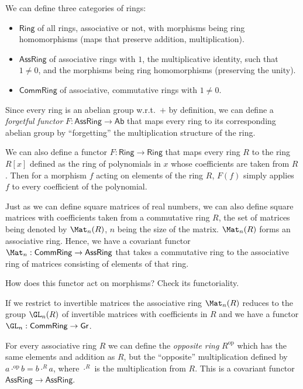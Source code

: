 We can define three categories of rings:
\begin{itemize}
    \item $\mathsf{Ring}$ of all rings, associative or not, with morphisms
    being ring homomorphisms (maps that preserve addition, multiplication).
    \item $\mathsf{AssRing}$ of associative rings with $1$, the multiplicative
    identity, such that $1\neq0$, and the morphisms being ring homomorphisms
    (preserving the unity).
    \item $\mathsf{CommRing}$ of associative, commutative rings with $1\neq0$. 
\end{itemize}
\begin{example}
    Since every ring is an abelian group w.r.t.\ $+$ by definition,
    we can define a \emph{forgetful functor} $F:\mathsf{AssRing}\rightarrow\mathsf{Ab}$
    that maps every ring to its corresponding abelian group by ``forgetting''
    the multiplication structure of the ring.
\end{example}
%
\begin{example}
    We can also define a functor $F:\mathsf{Ring}\rightarrow\mathsf{Ring}$
    that maps every ring $R$ to the ring $R[x]$ defined as the ring
    of polynomials in $x$ whose coefficients are taken from $R$. Then
    for a morphism $f$ acting on elements of the ring $R$, $F\left(f\right)$
    simply applies $f$ to every coefficient of the polynomial.
\end{example}
%
\begin{example}
    Just as we can define square matrices of real numbers, we can also
    define square matrices with coefficients taken from a commutative
    ring $R$, the set of matrices being denoted by $\Mat_n(R)$,
    $n$ being the size of the matrix. $\Mat_n(R)$ forms an associative
    ring. Hence, we have a covariant functor $\Mat_n:\mathsf{CommRing}\rightarrow\mathsf{AssRing}$
    that takes a commutative ring to the associative ring of matrices consisting of elements of that ring. 
\end{example}
\begin{xca}
    How does this functor act on morphisms? Check its functoriality.
\end{xca}
\begin{example}
    If we restrict to invertible matrices the associative ring $\Mat_n(R)$
    reduces to the group $\GL_n(R)$ of invertible matrices with
    coefficients in $R$ and we have a functor $\GL_n:\mathsf{CommRing}\rightarrow\mathsf{Gr}$.
\end{example}
%
\begin{example}
    For every associative ring $R$ we can define the \emph{opposite
    ring} $R^{\mathrm{op}}$ which has the same elements and addition as
    $R$, but the ``opposite'' multiplication defined by $a\cdot^{\mathrm{op}}b=b\cdot^{R}a$,
    where $\cdot^{R}$ is the multiplication from $R$. This is a covariant
    functor $\mathsf{AssRing}\to\mathsf{AssRing}$.
\end{example}

